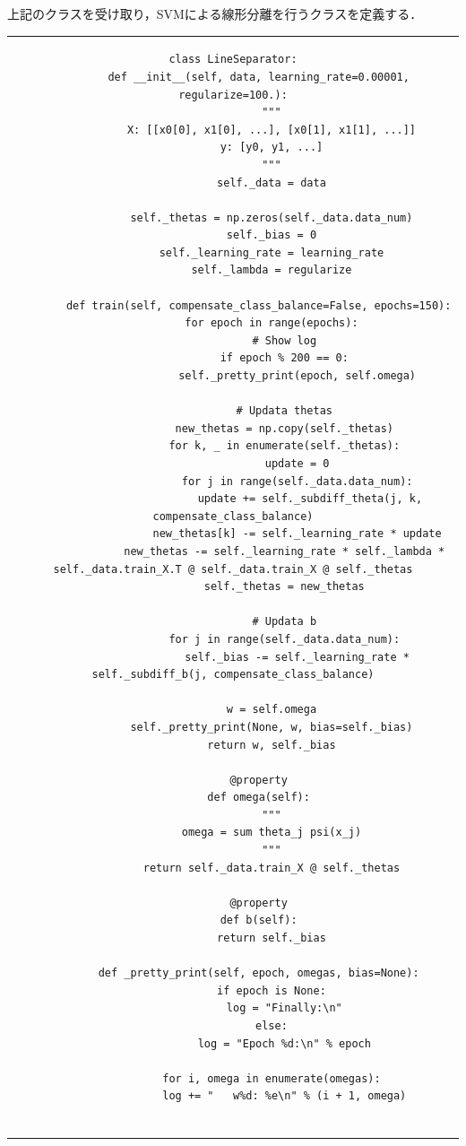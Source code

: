 \documentclass[dvipdfmx]{jsarticle}
\begin{document}
上記のクラスを受け取り，SVMによる線形分離を行うクラスを定義する．
\begin{center}
\begin{tabular}{c}
  \begin{lstlisting}[]
    class LineSeparator:
        def __init__(self, data, learning_rate=0.00001, regularize=100.):
            """
            X: [[x0[0], x1[0], ...], [x0[1], x1[1], ...]]
            y: [y0, y1, ...]
            """
            self._data = data

            self._thetas = np.zeros(self._data.data_num)
            self._bias = 0
            self._learning_rate = learning_rate
            self._lambda = regularize

        def train(self, compensate_class_balance=False, epochs=150):
            for epoch in range(epochs):
                # Show log
                if epoch % 200 == 0:
                    self._pretty_print(epoch, self.omega)

                # Updata thetas
                new_thetas = np.copy(self._thetas)
                for k, _ in enumerate(self._thetas):
                    update = 0
                    for j in range(self._data.data_num):
                        update += self._subdiff_theta(j, k, compensate_class_balance)
                    new_thetas[k] -= self._learning_rate * update
                new_thetas -= self._learning_rate * self._lambda * self._data.train_X.T @ self._data.train_X @ self._thetas
                self._thetas = new_thetas

                # Updata b
                for j in range(self._data.data_num):
                    self._bias -= self._learning_rate * self._subdiff_b(j, compensate_class_balance)

            w = self.omega
            self._pretty_print(None, w, bias=self._bias)
            return w, self._bias

        @property
        def omega(self):
            """
            omega = sum theta_j psi(x_j)
            """
            return self._data.train_X @ self._thetas

        @property
        def b(self):
            return self._bias

        def _pretty_print(self, epoch, omegas, bias=None):
            if epoch is None:
                log = "Finally:\n"
            else:
                log = "Epoch %d:\n" % epoch

            for i, omega in enumerate(omegas):
                log += "   w%d: %e\n" % (i + 1, omega)


\end{lstlisting}
\end{tabular}
\end{center}
\end{document}
